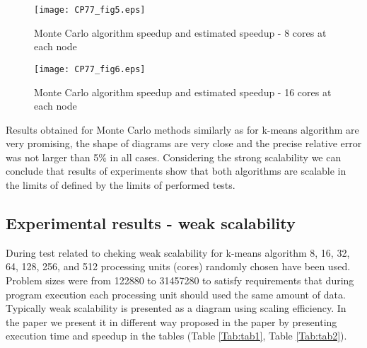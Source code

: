 \documentclass[runningheads]{llncs}
\begin{document}
\begin{figure}[bht!]
  \centering
  \texttt{[image: CP77\_fig5.eps]}
  \caption{Monte Carlo algorithm speedup and estimated speedup - 8 cores at each node}
  \label{fig_monte_carlo_speedup_8_cores}
\end{figure}

\begin{figure}[bht!]
  \centering
  \texttt{[image: CP77\_fig6.eps]}
  \caption{Monte Carlo algorithm speedup and estimated speedup - 16 cores at each node}
  \label{fig_monte_carlo_speedup_16_cores}
\end{figure}

Results obtained for Monte Carlo methods similarly as for k-means algorithm are very promising, the shape of diagrams are very close and the precise relative error was not larger than 5\% in all cases. Considering the strong scalability we can conclude that results of experiments show that both algorithms are scalable in the limits of defined by the limits of performed tests. 

\subsection{Experimental results - weak scalability}

During test related to cheking weak scalability for k-means algorithm  8, 16, 32, 64, 128, 256, and 512 processing units (cores) randomly chosen have been used. Problem sizes were from 122880 to 31457280 to satisfy requirements that during program execution each processing unit should used the same amount of data. Typically weak scalability is presented as a diagram using scaling efficiency. In the paper we present it in different way proposed in the paper \cite{kartawidjaja} by presenting execution time and speedup in the tables (Table \ref{Tab:tab1}, Table \ref{Tab:tab2}). 
\end{document}
